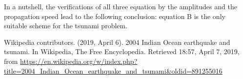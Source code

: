 \documentclass[a4paper,12pt,twoside]{article}
\begin{document}
      In a nutshell, the verifications of all three equation by the amplitudes and the propagation speed lead to the following conclusion: equation B is the only suitable scheme for the tsunami problem.


  \newpage
  \begin{thebibliography}{99}
     Wikipedia contributors. (2019, April 6). 2004 Indian Ocean earthquake and tsunami. In Wikipedia, The Free Encyclopedia. Retrieved 18:57, April 7, 2019, from \url{https://en.wikipedia.org/w/index.php?title=2004_Indian_Ocean_earthquake_and_tsunami&oldid=891255016}


  \end{thebibliography}
\end{document}
